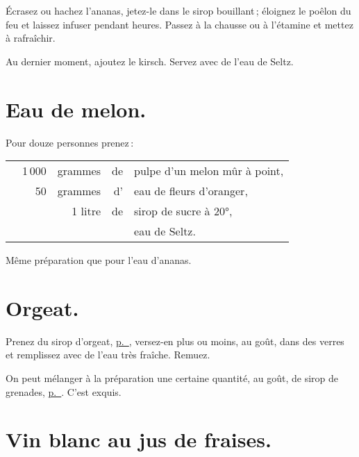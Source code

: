 Écrasez ou hachez l'ananas, jetez-le dans le sirop bouillant ; éloignez le
poêlon du feu et laissez infuser pendant {\mmm} heures. Passez à la
chausse ou à l'étamine et mettez à rafraîchir.

Au dernier moment, ajoutez le kirsch. Servez avec de l’eau de Seltz.

\section*{\centering Eau de melon.}
{}

Pour douze personnes prenez :

\footnotesize
\begin{longtable}{rrrrp{16em}}
  & 1 000 & grammes & de & pulpe d'un melon mûr à point,                                                  \\
  &    50 & grammes & d' & eau de fleurs d'oranger,                                                       \\
  & \multicolumn{2}{r}{1 litre} & de & sirop de sucre à 20°,                                              \\
  &       &         &    & eau de Seltz.                                                                  \\
\end{longtable}
\normalsize

Même préparation que pour l'eau d’ananas.

\section*{\centering Orgeat.}
{}

Prenez du sirop d'orgeat, \hyperlink{p0989}{p. \pageref{pg0989}}, versez-en plus
ou moins, au goût, dans des verres et remplissez avec de l'eau très fraîche.
Remuez.

On peut mélanger à la préparation une certaine quantité, au goût, de sirop de
grenades, \hyperlink{p0988}{p. \pageref{pg0988}}. C'est exquis.

\section*{\centering Vin blanc au jus de fraises.}
{}


